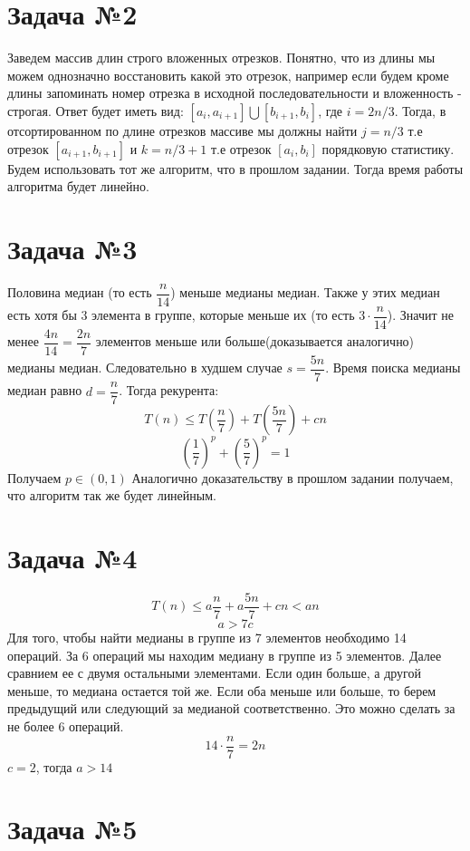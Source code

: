 \documentclass{article}
\begin{document}
\section*{Задача №2}
    Заведем массив длин строго вложенных отрезков. Понятно, что из длины мы можем однозначно восстановить какой это отрезок, например если будем кроме длины запоминать номер отрезка в исходной последовательности и вложенность - строгая. 
    Ответ будет иметь вид: $[a_i, a_{i + 1}] \bigcup [b_{i + 1}, b_i]$, где $i = 2n/3$.
    Тогда, в отсортированном по длине отрезков массиве мы должны найти $j = n/3$ т.е отрезок $[a_{i + 1}, b_{i + 1}]$ и $k = n/3 + 1$ т.е отрезок $[a_{i}, b_{i}]$ порядковую статистику. 
    Будем использовать тот же алгоритм, что в прошлом задании. Тогда время работы алгоритма будет линейно. 


\section*{Задача №3}
    Половина медиан (то есть $\dfrac{n}{14}$) меньше медианы медиан. Также у этих медиан есть хотя бы 3 элемента в группе, которые меньше их (то есть $3 \cdot \dfrac{n}{14} $). Значит не менее $\dfrac{4n}{14} = \dfrac{2n}{7}$ элементов меньше или больше(доказывается аналогично) медианы медиан. Следовательно в худшем случае $s = \dfrac{5n}{7}$. Время поиска медианы медиан равно $d = \dfrac{n}{7}$. Тогда рекурента:
    \[ T(n) \leqslant T\left(\dfrac{n}{7}\right) + T\left(\dfrac{5n}{7}\right) + cn \]
    \[ \left(\dfrac{1}{7}\right)^p + \left(\dfrac{5}{7}\right)^p = 1 \] Получаем $p \in (0, 1)$
    Аналогично доказательству в прошлом задании получаем, что алгоритм так же будет линейным.

\section*{Задача №4}
    \[ T(n) \leqslant a \dfrac{n}{7} + a \dfrac{5n}{7} + cn < an \] 
    \[ a > 7c \] 
    Для того, чтобы найти медианы в группе из 7 элементов необходимо 14 операций. За 6 операций мы находим медиану в группе из 5 элементов. Далее сравнием ее с двумя остальными элементами. Если один больше, а другой меньше, то медиана остается той же. Если оба меньше или больше, то берем предыдущий или следующий за медианой соответственно. Это можно сделать за не более 6 операций. 
    \[ 14 \cdot \dfrac{n}{7} = 2n \] 
    $c = 2$, тогда $a > 14$

\section*{Задача №5}
\end{document}

